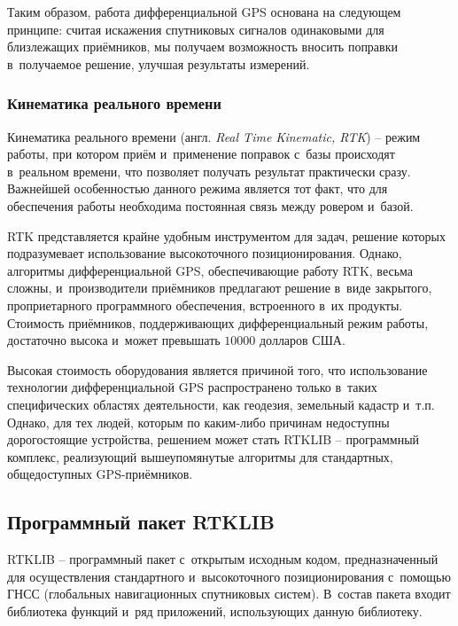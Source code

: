 Таким образом, работа дифференциальной GPS основана на следующем принципе: считая искажения спутниковых сигналов одинаковыми для близлежащих приёмников, мы получаем возможность вносить поправки в~получаемое решение, улучшая результаты измерений.

\subsubsection{Кинематика реального времени}
\label{subsec:rtk}

Кинематика реального времени (англ. \emph{Real Time Kinematic, RTK}) -- режим работы, при котором приём и~применение поправок с~базы происходят в~реальном времени, что позволяет получать результат практически сразу. Важнейшей особенностью данного режима является тот факт, что для обеспечения работы необходима постоянная связь между ровером и~базой. \par

RTK представляется крайне удобным инструментом для задач, решение которых подразумевает использование высокоточного позиционирования. Однако, алгоритмы дифференциальной GPS, обеспечивающие работу RTK, весьма сложны, и~производители приёмников предлагают решение в~виде закрытого, проприетарного программного обеспечения, встроенного в~их продукты. Стоимость приёмников, поддерживающих дифференциальный режим работы, достаточно высока и~может превышать $10000$ долларов США. \par

Высокая стоимость оборудования является причиной того, что использование технологии дифференциальной GPS распространено только в~таких специфических областях деятельности, как геодезия, земельный кадастр и~т.п. Однако, для тех людей, которым по каким-либо причинам недоступны дорогостоящие устройства, решением может стать RTKLIB -- программный комплекс, реализующий вышеупомянутые алгоритмы для стандартных, общедоступных GPS-приёмников.

\subsection{Программный пакет RTKLIB}
\label{subsec:rtklib}

RTKLIB -- программный пакет с~открытым исходным кодом, предназначенный для осуществления стандартного и~высокоточного позиционирования с~помощью ГНСС (глобальных навигационных спутниковых систем). В~состав пакета входит библиотека функций и~ряд приложений, использующих данную библиотеку. \par

